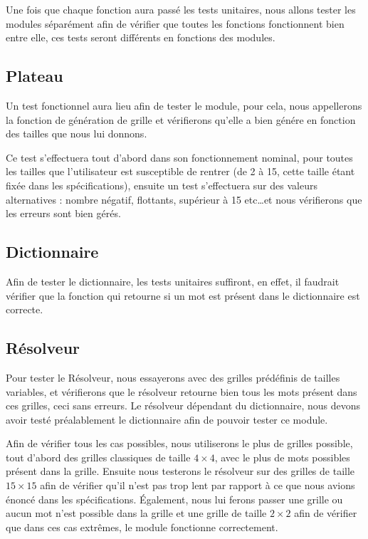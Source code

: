 \documentclass[12pt,a4paper,openany]{article}
\begin{document}
	Une fois que chaque fonction aura passé les tests unitaires, nous allons tester les modules séparément afin de vérifier que toutes les fonctions fonctionnent
	bien entre elle, ces tests seront différents en fonctions des modules.

	\subsection{Plateau}
		Un test fonctionnel aura lieu afin de tester le module, pour cela, nous appellerons la fonction de génération de grille et vérifierons qu'elle a bien
		génére en fonction des tailles que nous lui donnons. 

		Ce test s'effectuera tout d'abord dans son fonctionnement nominal, pour toutes les tailles que l'utilisateur est susceptible de rentrer (de 2 à 15, cette
		taille étant fixée dans les spécifications), ensuite un test s'effectuera sur des valeurs alternatives : nombre négatif, flottants, supérieur à 15
		etc\ldots et nous vérifierons que les erreurs sont bien gérés.
	\subsection{Dictionnaire}
		Afin de tester le dictionnaire, les tests unitaires suffiront, en effet, il faudrait vérifier que la fonction qui retourne si un mot est présent dans le
		dictionnaire est correcte.

	\subsection{Résolveur}
		Pour tester le Résolveur, nous essayerons avec des grilles prédéfinis de tailles variables, et vérifierons que le résolveur retourne bien tous les
		mots présent dans ces grilles, ceci sans erreurs. Le résolveur dépendant du dictionnaire, nous devons avoir testé préalablement le dictionnaire afin de
		pouvoir tester ce module.

		Afin de vérifier tous les cas possibles, nous utiliserons le plus de grilles possible, tout d'abord des grilles classiques de taille $4\times4$, 
		avec le plus de mots possibles présent dans la grille. Ensuite nous testerons le résolveur sur des grilles de taille $15\times 15$ afin de 
		vérifier qu'il n'est pas trop lent par rapport à ce que nous avions énoncé dans les spécifications. Également, nous lui
		ferons passer une grille ou aucun mot n'est possible dans la grille et une grille de taille $2\times 2$ afin de vérifier que dans ces cas extrêmes, le module fonctionne correctement.
\end{document}
